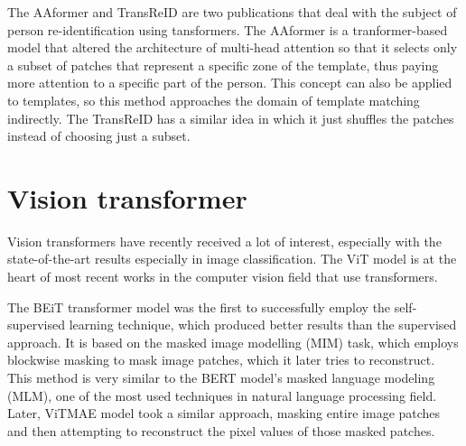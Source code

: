 \documentclass{report}[12pt, a4paper]
\begin{document}

The AAformer\cite{aatransformer_paper} and TransReID\cite{transreid_paper} are two publications that deal with the subject of person re-identification using tansformers. The AAformer is a tranformer-based model that altered the architecture of multi-head attention so that it selects only a subset of patches that represent a specific zone of the template, thus paying more attention to a specific part of the person. This concept can also be applied to templates, so this method approaches the domain of template matching indirectly. The TransReID has a similar idea in which it just shuffles the patches instead of choosing just a subset.

\section{Vision transformer}

Vision transformers have recently received a lot of interest, especially with the state-of-the-art results especially in image classification. The ViT model is at the heart of most recent works in the computer vision field that use transformers.


The BEiT\cite{beit_paper} transformer model was the first to successfully employ the self-supervised learning technique, which produced better results than the supervised approach. It is based on the masked image modelling (MIM) task, which employs blockwise masking to mask image patches, which it later tries to reconstruct. This method is very similar to the BERT\cite{bert_paper} model's masked language modeling (MLM), one of the most used techniques in natural language processing field. Later, ViTMAE\cite{vitmae_paper} model took a similar approach, masking entire image patches and then attempting to reconstruct the pixel values of those masked patches.
\end{document}
